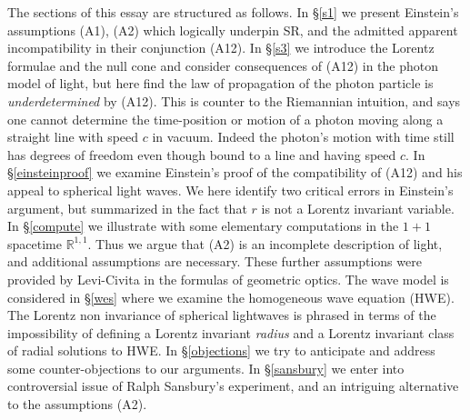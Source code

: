 \documentclass[12pt]{amsart}
\newcommand{\bR}{\mathbb{R}}
\begin{document}
The sections of this essay are structured as follows. In \S \ref{s1} we present Einstein's assumptions (A1), (A2) which logically underpin SR, and the admitted apparent incompatibility in their conjunction (A12). In \S \ref{s3} we introduce the Lorentz formulae and the null cone and consider consequences of (A12) in the photon model of light, but here find the law of propagation of the photon particle is \emph{underdetermined} by (A12). This is counter to the Riemannian intuition, and says one cannot determine the time-position or motion of a photon moving along a straight line with speed $c$ in vacuum. Indeed the photon's motion with time still has degrees of freedom even though bound to a line and having speed $c$. In \S \ref{einsteinproof} we examine Einstein's proof of the compatibility of (A12) and his appeal to spherical light waves. We here identify two critical errors in Einstein's argument, but summarized in the fact that $r$ is not a Lorentz invariant variable. In \S \ref{compute} we illustrate with some elementary computations in the $1+1$ spacetime $\bR^{1,1}$. Thus we argue that (A2) is an incomplete description of light, and additional assumptions are necessary. These further assumptions were provided by Levi-Civita in the formulas of geometric optics. The wave model is considered in \S \ref{wes} where we examine the homogeneous wave equation (HWE). The Lorentz non invariance of spherical lightwaves is phrased in terms of the impossibility of defining a Lorentz invariant \emph{radius} and a Lorentz invariant class of radial solutions to HWE. In \S \ref{objections} we try to anticipate and address some counter-objections to our arguments. In \S \ref{sansbury} we enter into controversial issue of Ralph Sansbury's experiment, and an intriguing alternative to the assumptions (A2). 




\end{document}
